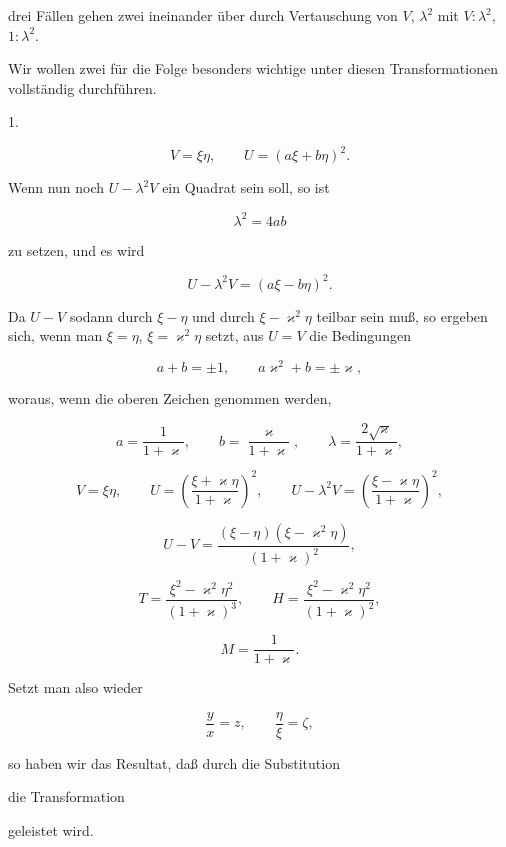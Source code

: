 drei Fällen gehen zwei ineinander über durch Vertauschung von
$V$, $\lambda^2$ mit $V:\lambda^2$, $1:\lambda^2$.

Wir wollen zwei für die Folge besonders wichtige unter diesen
Transformationen vollständig durchführen.

\begin{center}
1. 
\end{center}

\[
V = \xi\eta, \qquad U = (a\xi+b\eta)^2.
\]

Wenn nun noch $U - \lambda^2 V$ ein Quadrat sein soll, so ist

\[
\lambda^2 = 4ab
\]

zu setzen, und es wird

\[
U - \lambda^2 V = (a\xi - b\eta)^2.
\]

Da $U-V$ sodann durch $\xi-\eta$ und durch $\xi-\varkappa^2\eta$ teilbar sein
muß, so ergeben sich, wenn man $\xi=\eta$, $\xi=\varkappa^2\eta$ setzt, aus
$U=V$ die Bedingungen

\[
a+b=\pm 1, \qquad a\varkappa^2+b=\pm\varkappa,
\]

woraus, wenn die oberen Zeichen genommen werden,

\[
a=\frac{1}{1+\varkappa}, \qquad b=\frac{\varkappa}{1+\varkappa}, \qquad
\lambda=\frac{2\sqrt{\varkappa}}{1+\varkappa},
\]

\[
V=\xi\eta, \qquad U=\left(\frac{\xi+\varkappa\eta}{1+\varkappa}\right)^2,
\qquad U-\lambda^2V=\left(\frac{\xi-\varkappa\eta}{1+\varkappa}\right)^2,
\]

\[
U-V=\frac{(\xi-\eta)(\xi-\varkappa^2\eta)}{(1+\varkappa)^2},
\]

\[
T=\frac{\xi^2-\varkappa^2\eta^2}{(1+\varkappa)^3}, \qquad
H=\frac{\xi^2-\varkappa^2\eta^2}{(1+\varkappa)^2},
\]

\[
M=\frac{1}{1+\varkappa}.
\]

Setzt man also wieder

\[
\frac{y}{x}=z, \qquad \frac{\eta}{\xi}=\zeta,
\]

so haben wir das Resultat, daß durch die Substitution


die Transformation


geleistet wird.
